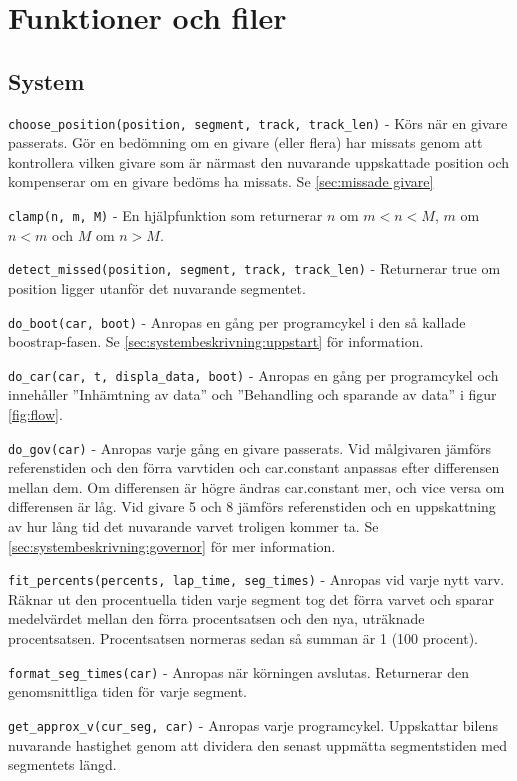 \section{Funktioner och filer}

\subsection{System}
\label{app:funktioner och filer:system}

\texttt{choose\_position(position, segment, track, track\_len)} - Körs när en
givare passerats. Gör en bedömning om en givare (eller flera) har missats genom
att kontrollera vilken givare som är närmast den nuvarande uppskattade position
och kompenserar om en givare bedöms ha missats. Se \ref{sec:missade givare}

\texttt{clamp(n, m, M)} - En hjälpfunktion som returnerar $n$ om $m < n < M$,
$m$ om $n < m$ och $M$ om $n > M$.

\texttt{detect\_missed(position, segment, track, track\_len)} - Returnerar true
om position ligger utanför det nuvarande segmentet.

\texttt{do\_boot(car, boot)} - Anropas en gång per programcykel i den så kallade
boostrap-fasen. Se \ref{sec:systembeskrivning:uppstart} för information.

\texttt{do\_car(car, t, displa\_data, boot)} - Anropas en gång per programcykel och innehåller ''Inhämtning av data'' och ''Behandling och sparande av data'' i figur \ref{fig:flow}.

\texttt{do\_gov(car)} - Anropas varje gång en givare passerats. Vid målgivaren
jämförs referenstiden och den förra varvtiden och car.constant anpassas efter
differensen mellan dem. Om differensen är högre ändras car.constant mer, och
vice versa om differensen är låg. Vid givare 5 och 8 jämförs referenstiden och
en uppskattning av hur lång tid det nuvarande varvet troligen kommer ta. Se
\ref{sec:systembeskrivning:governor} för mer information.

\texttt{fit\_percents(percents, lap\_time, seg\_times)} - Anropas vid varje nytt
varv. Räknar ut den procentuella tiden varje segment tog det förra varvet och
sparar medelvärdet mellan den förra procentsatsen och den nya, uträknade
procentsatsen. Procentsatsen normeras sedan så summan är 1 (100 procent).

\texttt{format\_seg\_times(car)} - Anropas när körningen avslutas. Returnerar
den genomsnittliga tiden för varje segment.

\texttt{get\_approx\_v(cur\_seg, car)} - Anropas varje programcykel. Uppskattar
bilens nuvarande hastighet genom att dividera den senast uppmätta segmentstiden
med segmentets längd.

